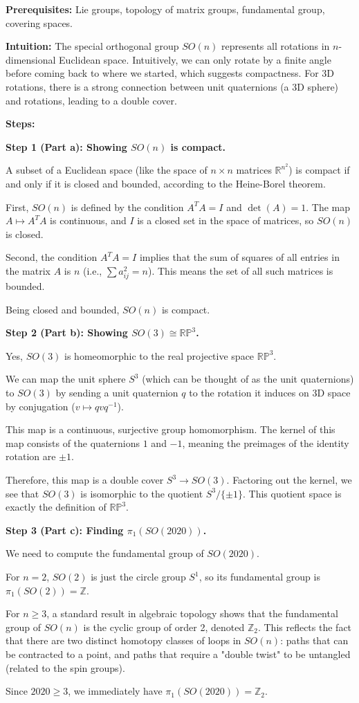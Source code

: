 \begin{solution}
\textbf{Prerequisites:} Lie groups, topology of matrix groups, fundamental group, covering spaces.

\textbf{Intuition:} The special orthogonal group $SO(n)$ represents all rotations in $n$-dimensional Euclidean space. Intuitively, we can only rotate by a finite angle before coming back to where we started, which suggests compactness. For 3D rotations, there is a strong connection between unit quaternions (a 3D sphere) and rotations, leading to a double cover.

\textbf{Steps:}

\textbf{Step 1 (Part a): Showing $SO(n)$ is compact.}

A subset of a Euclidean space (like the space of $n \times n$ matrices $\mathbb{R}^{n^2}$) is compact if and only if it is closed and bounded, according to the Heine-Borel theorem.

First, $SO(n)$ is defined by the condition $A^T A = I$ and $\det(A) = 1$. The map $A \mapsto A^T A$ is continuous, and $I$ is a closed set in the space of matrices, so $SO(n)$ is closed.

Second, the condition $A^T A = I$ implies that the sum of squares of all entries in the matrix $A$ is $n$ (i.e., $\sum a_{ij}^2 = n$). This means the set of all such matrices is bounded.

Being closed and bounded, $SO(n)$ is compact.

\textbf{Step 2 (Part b): Showing $SO(3) \cong \mathbb{RP}^3$.}

Yes, $SO(3)$ is homeomorphic to the real projective space $\mathbb{RP}^3$.

We can map the unit sphere $S^3$ (which can be thought of as the unit quaternions) to $SO(3)$ by sending a unit quaternion $q$ to the rotation it induces on 3D space by conjugation ($v \mapsto qvq^{-1}$).

This map is a continuous, surjective group homomorphism. The kernel of this map consists of the quaternions $1$ and $-1$, meaning the preimages of the identity rotation are $\pm 1$.

Therefore, this map is a double cover $S^3 \to SO(3)$. Factoring out the kernel, we see that $SO(3)$ is isomorphic to the quotient $S^3/\{\pm 1\}$. This quotient space is exactly the definition of $\mathbb{RP}^3$.

\textbf{Step 3 (Part c): Finding $\pi_1(SO(2020))$.}

We need to compute the fundamental group of $SO(2020)$.

For $n=2$, $SO(2)$ is just the circle group $S^1$, so its fundamental group is $\pi_1(SO(2)) = \mathbb{Z}$.

For $n \geq 3$, a standard result in algebraic topology shows that the fundamental group of $SO(n)$ is the cyclic group of order 2, denoted $\mathbb{Z}_2$. This reflects the fact that there are two distinct homotopy classes of loops in $SO(n)$: paths that can be contracted to a point, and paths that require a "double twist" to be untangled (related to the spin groups).

Since $2020 \geq 3$, we immediately have $\pi_1(SO(2020)) = \mathbb{Z}_2$.
\end{solution}

